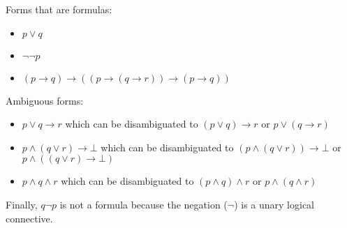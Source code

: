 
Forms that are formulas:
\begin{itemize}
\item $p \lor q$
\item $\neg\neg p$
\item $(p \to q) \to ((p \to (q \to r)) \to (p \to q))$
\end{itemize}

Ambiguous forms:
\begin{itemize}
\item $p \lor q \to r$ which can be disambiguated to $(p \lor q) \to r$ or $p \lor (q \to r)$
\item $p \land (q \lor r) \to \bot$ which can be disambiguated to $(p \land (q \lor r)) \to \bot$ or $p \land ((q \lor r) \to \bot)$
\item $p \land q \land r$ which can be disambiguated to $(p \land q) \land r$ or $p \land (q \land r)$
\end{itemize}

Finally, $q \neg p$ is not a formula because the negation ($\neg$) is a unary logical connective.
